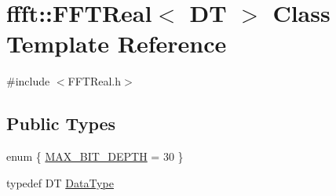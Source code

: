 \hypertarget{classffft_1_1FFTReal}{}\section{ffft\+:\+:F\+F\+T\+Real$<$ DT $>$ Class Template Reference}
\label{classffft_1_1FFTReal}


{\ttfamily \#include $<$F\+F\+T\+Real.\+h$>$}

\subsection*{Public Types}
\begin{DoxyCompactItemize}
\item 
enum \{ \hyperlink{classffft_1_1FFTReal_a39f5a2ec14c15f9198268500716e5dbaabec37ae38b07b6e3e1230562f01882a2}{M\+A\+X\+\_\+\+B\+I\+T\+\_\+\+D\+E\+P\+TH} = 30
 \}
\item 
typedef DT \hyperlink{classffft_1_1FFTReal_a606148f1cf8c3b7d705473932fc063d1}{Data\+Type}
\end{DoxyCompactItemize}
